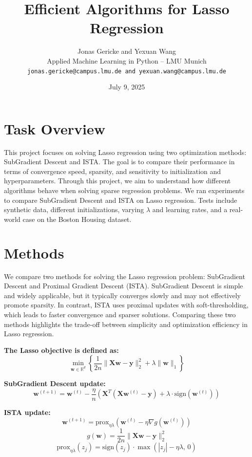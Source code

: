 \documentclass[11pt]{article}
\title{\textbf{Efficient Algorithms for Lasso Regression}}
\author{Jonas Gericke and Yexuan Wang \\
Applied Machine Learning in Python -- LMU Munich \\
\texttt{jonas.gericke@campus.lmu.de and yexuan.wang@campus.lmu.de}}
\date{July 9, 2025}
\begin{document}
\maketitle

\section{Task Overview}

This project focuses on solving Lasso regression using two optimization methods: SubGradient Descent and ISTA. The goal is to compare their performance in terms of convergence speed, sparsity, and sensitivity to initialization and hyperparameters.
Through this project, we aim to understand how different algorithms behave when solving sparse regression problems.
We ran experiments to compare SubGradient Descent and ISTA on Lasso regression. Tests include synthetic data, different initializations, varying \(\lambda\) and learning rates, and a real-world case on the Boston Housing dataset.

\section{Methods}

We compare two methods for solving the Lasso regression problem: SubGradient Descent and Proximal Gradient Descent (ISTA).
SubGradient Descent is simple and widely applicable, but it typically converges slowly and may not effectively promote sparsity. In contrast, ISTA uses proximal updates with soft-thresholding, which leads to faster convergence and sparser solutions. Comparing these two methods highlights the trade-off between simplicity and optimization efficiency in Lasso regression.

\noindent\textbf{The Lasso objective is defined as:}
\[
    \min_{\mathbf{w} \in \mathbb{R}^d} \left\{ \frac{1}{2n} \|\mathbf{Xw} - \mathbf{y}\|_2^2 + \lambda \|\mathbf{w}\|_1 \right\}
\]

\noindent\textbf{SubGradient Descent update:}
\[
    \mathbf{w}^{(t+1)} = \mathbf{w}^{(t)} - \frac{\eta}{n} \left( \mathbf{X}^T ( \mathbf{X} \mathbf{w}^{(t)} - \mathbf{y}) + \lambda \cdot \text{sign}(\mathbf{w}^{(t)}) \right)
\]

\noindent\textbf{ISTA update:}
\[
    \mathbf{w}^{(t+1)} = \text{prox}_{\eta \lambda} \left( \mathbf{w}^{(t)} - \eta \nabla g(\mathbf{w}^{(t)}) \right)
\]
\[
    g(\textbf{w}) = \frac{1}{2n} \| \textbf{X} \textbf{w} - \textbf{y} \|_2^2
\]
\[
    \text{prox}_{\eta \lambda}(z_j) = \text{sign}(z_j) \cdot \max\left( |z_j| - \eta \lambda, \, 0 \right)
\]
\end{document}
